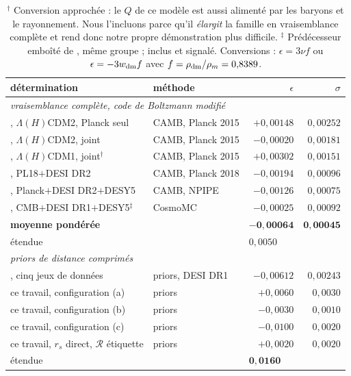 \documentclass[11pt,a4paper]{article}
\begin{document}
\begin{table}[t]
\centering
\begin{tabular}{llrr}
\toprule
détermination & méthode & $\epsilon$ & $\sigma$ \\
\midrule
\multicolumn{4}{l}{\emph{vraisemblance complète, code de Boltzmann modifié}}\\
\citet{tsiapi2019}, $\Lambda(H)$CDM2, Planck seul & CAMB, Planck 2015 & $+0{,}00148$ & $0{,}00252$\\
\citet{tsiapi2019}, $\Lambda(H)$CDM2, joint       & CAMB, Planck 2015 & $-0{,}00020$ & $0{,}00181$\\
\citet{tsiapi2019}, $\Lambda(H)$CDM1, joint$^\dagger$ & CAMB, Planck 2015 & $+0{,}00302$ & $0{,}00151$\\
\citet{kumar2025}, PL18$+$DESI DR2                & CAMB, Planck 2018 & $-0{,}00194$ & $0{,}00096$\\
\citet{li2025}, Planck$+$DESI DR2$+$DESY5         & CAMB, NPIPE       & $-0{,}00126$ & $0{,}00075$\\
\citet{li2024}, CMB$+$DESI DR1$+$DESY5$^\ddagger$ & CosmoMC           & $-0{,}00025$ & $0{,}00092$\\
\midrule
\multicolumn{2}{l}{\textbf{moyenne pondérée}} & $\mathbf{-0{,}00064}$ & $\mathbf{0{,}00045}$\\
\multicolumn{2}{l}{étendue} & \multicolumn{2}{l}{$0{,}0050$}\\
\midrule
\multicolumn{4}{l}{\emph{priors de distance comprimés}}\\
\citet{yang2025}, cinq jeux de données            & priors, DESI DR1 & $-0{,}00612$ & $0{,}00243$\\
ce travail, configuration (a)                     & priors           & $+0{,}0060$ & $0{,}0030$\\
ce travail, configuration (b)                     & priors           & $-0{,}0030$ & $0{,}0010$\\
ce travail, configuration (c)                     & priors           & $-0{,}0100$ & $0{,}0020$\\
ce travail, $r_s$ direct, $\mathcal{R}$ étiquette & priors           & $+0{,}0020$ & $0{,}0020$\\
\midrule
\multicolumn{2}{l}{étendue} & \multicolumn{2}{l}{$\mathbf{0{,}0160}$}\\
\bottomrule
\end{tabular}
\caption{$^\dagger$ Conversion approchée : le $Q$ de ce modèle est aussi alimenté par les
baryons et le rayonnement. Nous l'incluons parce qu'il \emph{élargit} la famille en
vraisemblance complète et rend donc notre propre démonstration plus difficile.
$^\ddagger$ Prédécesseur emboîté de \citet{li2025}, même groupe ; inclus et signalé.
Conversions : $\epsilon=3\nu f$ ou $\epsilon=-3w_{\rm dm}f$ avec
$f=\rho_{\rm dm}/\rho_m=0{,}8389$.}
\label{tab:litterature}
\end{table}
\end{document}
